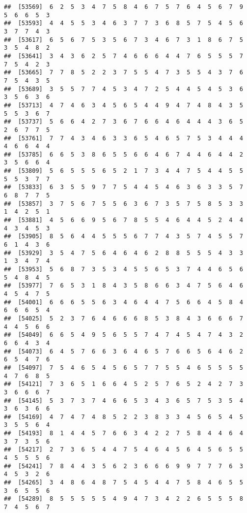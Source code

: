 \documentclass[
]{book}
\begin{document}
\begin{verbatim}
##  [53569]  6  2  5  3  4  7  5  8  4  6  7  5  7  6  4  5  6  7  9  5  6  6  5  3
##  [53593]  4  4  5  5  3  4  6  3  7  7  3  6  8  5  7  5  4  5  6  3  7  7  4  3
##  [53617]  6  5  6  7  5  3  5  6  7  3  4  6  7  3  1  8  6  7  5  3  5  4  8  2
##  [53641]  3  4  3  6  2  5  7  4  6  6  6  4  4  7  6  5  5  5  7  7  5  4  2  3
##  [53665]  7  7  8  5  2  2  3  7  5  5  4  7  3  5  5  4  3  7  6  7  5  4  3  5
##  [53689]  3  5  5  7  7  4  5  3  4  7  2  5  4  4  5  4  5  3  6  3  5  6  3  6
##  [53713]  4  7  4  6  3  4  5  6  5  4  4  9  4  7  4  8  4  3  5  5  5  3  6  7
##  [53737]  5  6  6  4  2  7  3  6  7  6  6  4  6  4  4  4  3  6  5  2  6  7  7  5
##  [53761]  7  7  4  3  4  6  3  3  6  5  4  6  5  7  5  3  4  4  4  4  6  6  4  4
##  [53785]  6  6  5  3  8  6  5  5  6  6  4  6  7  4  4  6  4  4  2  3  5  6  6  4
##  [53809]  5  6  5  5  5  6  5  2  1  7  3  4  4  7  5  4  4  5  5  5  5  3  7  7
##  [53833]  6  3  5  5  9  7  7  5  4  4  5  4  6  3  6  3  3  5  7  6  8  7  7  5
##  [53857]  3  7  5  6  7  5  5  6  3  6  7  3  5  7  5  8  5  3  3  1  4  2  5  1
##  [53881]  4  5  6  6  9  5  6  7  8  5  5  4  6  4  4  5  2  4  4  4  3  4  5  3
##  [53905]  8  5  6  4  4  5  5  5  6  7  7  4  3  5  7  4  5  5  7  6  1  4  3  6
##  [53929]  3  5  4  7  5  6  4  6  4  6  2  8  8  5  5  5  4  3  3  1  3  4  7  4
##  [53953]  5  6  8  7  3  5  3  4  5  5  6  5  3  7  4  4  6  5  6  5  4  8  4  5
##  [53977]  7  6  5  3  1  8  4  3  5  8  6  6  3  4  7  5  6  4  6  4  5  4  7  5
##  [54001]  6  6  6  5  5  6  3  4  6  4  4  7  5  6  6  4  5  8  4  6  6  6  5  4
##  [54025]  5  2  3  7  6  4  6  6  6  8  5  3  8  4  3  6  6  6  7  4  4  5  6  6
##  [54049]  6  6  5  4  9  5  6  5  5  7  4  7  4  5  4  7  4  3  2  6  6  4  3  4
##  [54073]  6  4  5  7  6  6  3  6  4  6  5  7  6  6  5  6  4  6  2  6  5  4  7  6
##  [54097]  7  5  4  6  5  4  5  6  5  7  7  5  5  4  6  5  5  5  5  4  7  6  8  5
##  [54121]  7  3  6  5  1  6  6  4  5  2  5  7  6  5  2  4  2  7  3  3  6  6  6  7
##  [54145]  5  3  7  3  7  4  6  6  5  3  4  3  6  5  7  5  3  5  4  3  6  3  6  6
##  [54169]  4  7  4  7  4  8  5  2  2  3  8  3  3  4  5  6  5  4  5  3  5  5  6  4
##  [54193]  8  1  4  4  5  7  6  6  3  4  2  2  7  5  8  4  4  6  4  3  7  3  5  6
##  [54217]  2  7  3  6  5  4  4  7  5  4  6  4  5  6  4  5  6  5  5  4  5  5  5  6
##  [54241]  7  8  4  4  3  5  6  2  3  6  6  6  9  9  7  7  7  6  3  4  5  3  2  6
##  [54265]  3  4  8  6  4  8  7  5  4  5  4  4  7  5  8  4  6  5  5  3  6  5  5  6
##  [54289]  8  5  5  5  5  5  4  9  4  7  3  4  2  2  6  5  5  5  8  7  4  5  6  7

\end{verbatim}
\end{document}
